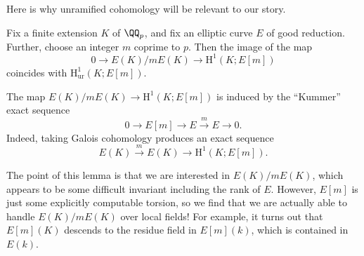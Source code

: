 \documentclass[../notes.tex]{subfiles}
\begin{document}
Here is why unramified cohomology will be relevant to our story.
\begin{lemma}
	Fix a finite extension $K$ of $\QQ_p$, and fix an elliptic curve $E$ of good reduction. Further, choose an integer $m$ coprime to $p$. Then the image of the map
	\[0\to E(K)/mE(K)\to\mathrm H^1(K;E[m])\]
	coincides with $\mathrm H^1_{\mathrm{ur}}(K;E[m])$.
\end{lemma}
\begin{remark}
	The map $E(K)/mE(K)\to\mathrm H^1(K;E[m])$ is induced by the ``Kummer'' exact sequence
	\[0\to E[m]\to E\stackrel m\to E\to0.\]
	Indeed, taking Galois cohomology produces an exact sequence
	\[E(K)\stackrel m\to E(K)\to\mathrm H^1(K;E[m]).\]
\end{remark}
The point of this lemma is that we are interested in $E(K)/mE(K)$, which appears to be some difficult invariant including the rank of $E$. However, $E[m]$ is just some explicitly computable torsion, so we find that we are actually able to handle $E(K)/mE(K)$ over local fields! For example, it turns out that $E[m](K)$ descends to the residue field in $E[m](k)$, which is contained in $E(k)$.
\end{document}
